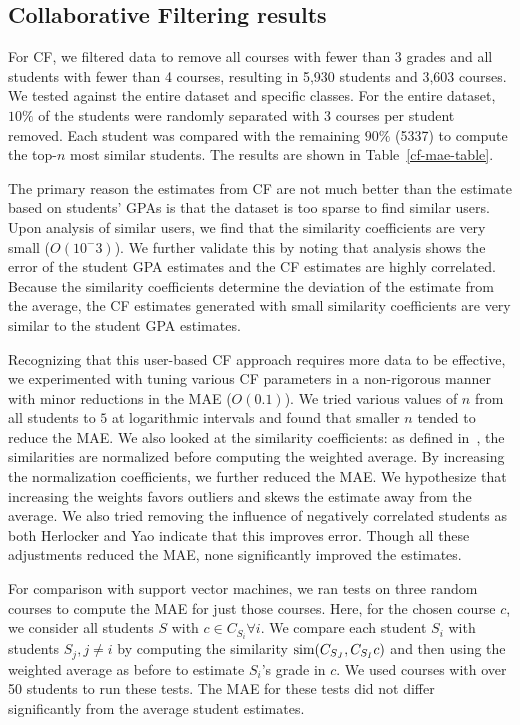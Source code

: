 \subsection{Collaborative Filtering results}

For CF, we filtered data to remove all courses with fewer than 3 grades and all students with fewer than 4 courses, resulting in 5,930 students and 3,603 courses.  We tested against the entire dataset and specific classes.  For the entire dataset, $10\%$ of the students were randomly separated with 3 courses per student removed.  Each student was compared with the remaining $90\%$ (5337) to compute the top-$n$ most similar students. The results are shown in Table~\ref{cf-mae-table}.

The primary reason the estimates from CF are not much better than the estimate based on students' GPAs is that the dataset is too sparse to find similar users.  Upon analysis of similar users, we find that the similarity coefficients are very small ($O(10^-3)$).  We further validate this by noting that analysis shows the error of the student GPA estimates and the CF estimates are highly correlated.  Because the similarity coefficients determine the deviation of the estimate from the average, the CF estimates generated with small similarity coefficients are very similar to the student GPA estimates.

Recognizing that this user-based CF approach requires more data to be effective, we experimented with tuning various CF parameters in a non-rigorous manner with minor reductions in the MAE ($O(0.1)$).  We tried various values of $n$ from all students to $5$ at logarithmic intervals and found that smaller $n$ tended to reduce the MAE.  We also looked at the similarity coefficients: as defined in~\cite{breese}, the similarities are normalized before computing the weighted average.  By increasing the normalization coefficients, we further reduced the MAE.  We hypothesize that increasing the weights favors outliers and skews the estimate away from the average.  We also tried removing the influence of negatively correlated students as both Herlocker and Yao indicate that this improves error.  Though all these adjustments reduced the MAE, none significantly improved the estimates. 

For comparison with support vector machines, we ran tests on three random courses to compute the MAE for just those courses.  Here, for the chosen course $c$, we consider all students $S$ with $c \in C_{S_i} \forall{i}$.  We compare each student $S_i$ with students $S_j, j \neq i$ by computing the similarity $\textrm{sim}(C_{S_J}, C_{S_I} \\ c)$ and then using the weighted average as before to estimate $S_i$'s grade in $c$.  We used courses with over 50 students to run these tests.  The MAE for these tests did not differ significantly from the average student estimates.

